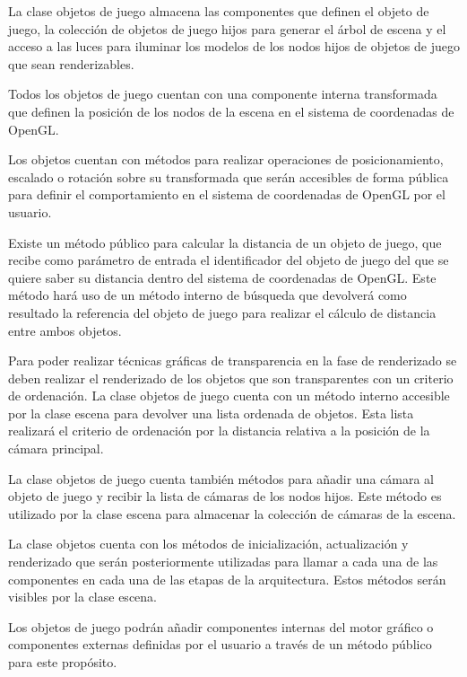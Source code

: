 \documentclass[a4paper, 17pt]{book}
\begin{document}
La clase objetos de juego almacena las componentes que definen el objeto de juego, la colección de objetos de juego hijos para generar
el árbol de escena y el acceso a las luces para iluminar los modelos de los nodos hijos de objetos de juego que sean renderizables.

Todos los objetos de juego cuentan con una componente interna transformada que definen la posición de los nodos de la escena en el
sistema de coordenadas de OpenGL. 

Los objetos cuentan con métodos para realizar operaciones de posicionamiento, escalado o rotación sobre su transformada que serán
accesibles de forma pública para definir el comportamiento en el sistema de coordenadas de OpenGL por el usuario.

Existe un método público para calcular la distancia de un objeto de juego, que recibe como parámetro de entrada el identificador
del objeto de juego del que se quiere saber su distancia dentro del sistema de coordenadas de OpenGL. Este método hará uso de
un método interno de búsqueda que devolverá como resultado la referencia del objeto de juego para realizar el cálculo de distancia
entre ambos objetos.

Para poder realizar técnicas gráficas de transparencia en la fase de renderizado se deben realizar el renderizado de los objetos
que son transparentes con un criterio de ordenación. La clase objetos de juego cuenta con un método interno accesible por la clase
escena para devolver una lista ordenada de objetos. Esta lista realizará el criterio de ordenación por la distancia relativa a la
posición de la cámara principal.
 
La clase objetos de juego cuenta también métodos para añadir una cámara al objeto de juego y recibir la lista de cámaras de los
nodos hijos. Este método es utilizado por la clase escena para almacenar la colección de cámaras de la escena.

La clase objetos cuenta con los métodos de inicialización, actualización y renderizado que serán posteriormente utilizadas para
llamar a cada una de las componentes en cada una de las etapas de la arquitectura. Estos métodos serán visibles por la clase escena.

Los objetos de juego podrán añadir componentes internas del motor gráfico o componentes externas definidas por el usuario a través
de un método público para este propósito.
\end{document}
